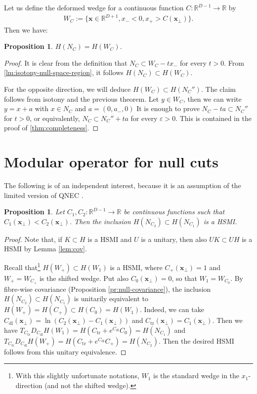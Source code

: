 \documentclass[12pt]{article}
\def\RR{{\mathbb R}}
\def\e{\varepsilon}
\def\tx{\pmb{x}}
\newtheorem{proposition}[theorem]{Proposition}
\theoremstyle{remark}
\begin{document}
Let us define the deformed wedge for a continuous function $C:\RR^{D-1}\rightarrow \RR$ by 
	\begin{align*}
		W_C:=\{\tx \in \RR^{D+1},x_-<0,x_+>C(\tx_\perp)\}.
	\end{align*} 
Then we have:
	\begin{proposition}\label{prop:N_C=W_C}
		$H(N_C)=H(W_C)$.
	\end{proposition}
	\begin{proof}
		It is clear from the definition that $N_C\subset W_C - tx_-$ for every $t>0$. From \autoref{lm:isotony-null-space-region}, it follows $H(N_C)\subset H(W_C)$.
		
		For the opposite direction, we will deduce $H(W_C) \subset H(N_C'')$. The claim follows from isotony and the previous theorem.
		Let $y\in W_C$, then we can write $y = x + a$ with $x \in N_C$ and $a=(0,a_-,0)$
		It is enough to prove $N_C-t a \subset N_C''$ for $t > 0$, or equivalently, $N_C\subset N_C''+t a$ for every $\e>0$.
		This is contained in the proof of \autoref{thm:completeness}.
			

	\end{proof}

\section{Modular operator for null cuts}\label{section-constant-null-cut}
 The following is of an independent interest, because it is an assumption of the limited version of QNEC \cite{CF18}.
 \begin{proposition}\label{pr:hsmi}
 Let $C_1, C_2:\RR^{D-1}\rightarrow \RR$ be continuous functions such that $C_1(\pmb{x}_\perp) < C_2(\pmb{x}_\perp)$.
Then the inclusion $H(N_{C_2})\subset H(N_{C_1})$ is a HSMI.   
\end{proposition}
\begin{proof}
Note that, if $K \subset H$ is a HSMI and $U$ is a unitary, then also $UK \subset UH$ is a HSMI by Lemma \ref{lem:cov}.

Recall that\footnote{With this slightly unfortunate notations, $W_1$ is the standard wedge in the $x_1$-direction
(and not the shifted wedge).} $H(W_+) \subset H(W_1)$ is a HSMI, where $C_+(\pmb{x}_\perp) = 1$ and $W_+ = W_{C_+}$ is the shifted wedge.
Put also $C_0(\pmb{x}_\perp) = 0$, so that $W_1 = W_{C_0}$.
By fibre-wise covariance (Proposition \ref{pr:null-covariance}), the inclusion
$H(N_{C_2})\subset H(N_{C_1})$ is unitarily equivalent to $H(W_+) = H(C_+)\subset H(C_0) = H(W_1)$.
Indeed, we can take $C_{\mathrm{dl}}(\pmb{x}_\perp) = \ln(C_2(\pmb{x}_\perp) - C_1(\pmb{x}_\perp))$
and $C_{\mathrm{tr}}(\pmb{x}_\perp) = C_1(\pmb{x}_\perp)$.
Then we have $T_{C_{\mathrm{tr}}}D_{C_{\mathrm{dl}}}H(W_1) = H(C_{\mathrm{tr}} + e^{C_{\mathrm{dl}}}C_0) = H(N_{C_1})$
and $T_{C_{\mathrm{tr}}}D_{C_{\mathrm{dl}}}H(W_+) = H(C_{\mathrm{tr}} + e^{C_{\mathrm{dl}}}C_+) = H(N_{C_2})$.
Then the desired HSMI follows from this unitary equivalence.

\end{proof}
\end{document}
